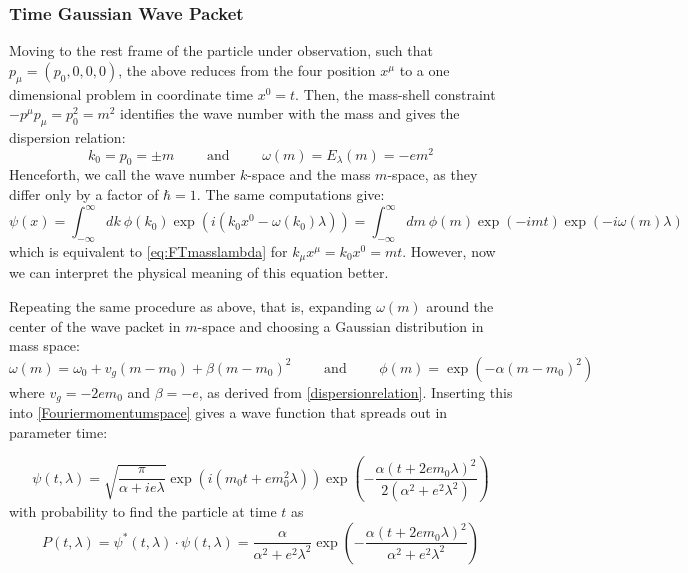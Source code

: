 \documentclass[twoside,a4paper,11pt]{article}
\numberwithin{equation}{section}
\begin{document}
\subsubsection{Time Gaussian Wave Packet}
Moving to the rest frame of the particle under observation, such that $p_\mu = (p_0, 0, 0, 0)$, the above reduces from the four position $x^\mu$ to a one dimensional problem in coordinate time $x^0 = t$. Then, the mass-shell constraint $- p^\mu p_\mu = p_0^2 = m^2$ identifies the wave number with the mass and gives the dispersion relation:
\begin{equation}
    k_0 = p_0 = \pm m  \qquad \text{ and } \qquad \omega(m) = E_\lambda (m)  = -em^2 
    \label{dispersionrelation}
\end{equation}
Henceforth, we call the wave number $k$-space and the mass $m$-space, as they differ only by a factor of $\hbar = 1$. The same computations give:
\begin{equation}
    \psi(x) = \int_{-\infty}^{\infty} dk \ \phi(k_0)  \exp{\left(i (k_0 x^0 - \omega(k_0) \lambda) \right)} = \int_{-\infty}^{\infty} dm \ \phi(m)  \exp{\left(-i m t \right)} \exp{\left( -i \omega(m) \lambda \right)}
    \label{Fouriermomentumspace}
\end{equation}
which is equivalent to \ref{eq:FTmasslambda} for $k_\mu x^\mu = k_0x^0 = mt $. However, now we can interpret the physical meaning of this equation better.

Repeating the same procedure as above, that is, expanding $\omega(m)$ around the center of the wave packet in $m$-space and choosing a Gaussian distribution in mass space:
\begin{equation}
    \omega(m) = \omega_0 + v_g (m - m_0) + \beta (m - m_0)^2 \qquad \text{ and } \qquad  \phi(m) = \exp{\left( - \alpha (m - m_0)^2 \right)}
\end{equation}
where $v_g = -2 e m_0 $ and $\beta = - e $, as derived from \ref{dispersionrelation}. Inserting this into \ref{Fouriermomentumspace} gives a wave function that spreads out in parameter time:

\begin{equation}
    \psi ( t, \lambda) = \sqrt{\frac{\pi}{\alpha + i e \lambda }} \exp{\left(i (m_0 t + e m_0^2 \lambda) \right)} \exp{\left(-\frac{ \alpha ( t +2 e m_0\lambda )^2}{2( \alpha^2 + e^2 \lambda^2)}\right)}
\end{equation}
with probability to find the particle at time $t$ as
\begin{equation}
    P(t,\lambda) = \psi^* ( t, \lambda) \cdot \psi ( t, \lambda) = \frac{ \alpha}{ \alpha^2 + e^2 \lambda^2} \exp{\left(-\frac{ \alpha ( t +2 e m_0\lambda )^2}{ \alpha^2 + e^2 \lambda^2}\right)}
\end{equation}
\end{document}
